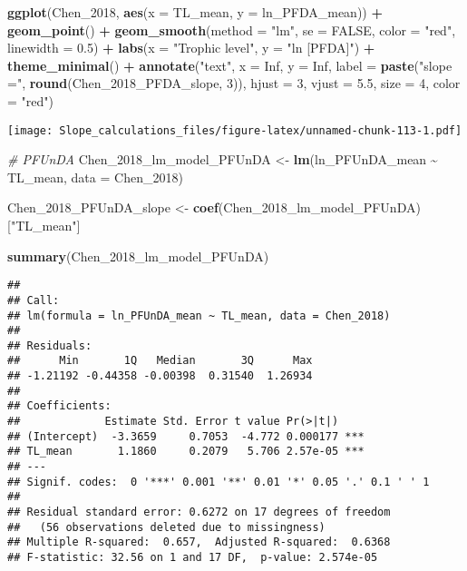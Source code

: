 \documentclass[
]{article}
\newenvironment{Shaded}{\begin{snugshade}}{\end{snugshade}}
\newcommand{\AttributeTok}[1]{\textcolor[rgb]{0.13,0.29,0.53}{#1}}
\newcommand{\CommentTok}[1]{\textcolor[rgb]{0.56,0.35,0.01}{\textit{#1}}}
\newcommand{\ConstantTok}[1]{\textcolor[rgb]{0.56,0.35,0.01}{#1}}
\newcommand{\DecValTok}[1]{\textcolor[rgb]{0.00,0.00,0.81}{#1}}
\newcommand{\FloatTok}[1]{\textcolor[rgb]{0.00,0.00,0.81}{#1}}
\newcommand{\FunctionTok}[1]{\textcolor[rgb]{0.13,0.29,0.53}{\textbf{#1}}}
\newcommand{\NormalTok}[1]{#1}
\newcommand{\OtherTok}[1]{\textcolor[rgb]{0.56,0.35,0.01}{#1}}
\newcommand{\SpecialCharTok}[1]{\textcolor[rgb]{0.81,0.36,0.00}{\textbf{#1}}}
\newcommand{\StringTok}[1]{\textcolor[rgb]{0.31,0.60,0.02}{#1}}
\begin{document}
\begin{Shaded}
\begin{Highlighting}[]
\FunctionTok{ggplot}\NormalTok{(Chen\_2018, }\FunctionTok{aes}\NormalTok{(}\AttributeTok{x =}\NormalTok{ TL\_mean, }\AttributeTok{y =}\NormalTok{ ln\_PFDA\_mean)) }\SpecialCharTok{+}
  \FunctionTok{geom\_point}\NormalTok{() }\SpecialCharTok{+}
  \FunctionTok{geom\_smooth}\NormalTok{(}\AttributeTok{method =} \StringTok{"lm"}\NormalTok{, }\AttributeTok{se =} \ConstantTok{FALSE}\NormalTok{, }\AttributeTok{color =} \StringTok{"red"}\NormalTok{, }\AttributeTok{linewidth =} \FloatTok{0.5}\NormalTok{) }\SpecialCharTok{+}
  \FunctionTok{labs}\NormalTok{(}\AttributeTok{x =} \StringTok{"Trophic level"}\NormalTok{,}
       \AttributeTok{y =} \StringTok{"ln [PFDA]"}\NormalTok{) }\SpecialCharTok{+}
  \FunctionTok{theme\_minimal}\NormalTok{() }\SpecialCharTok{+}
  \FunctionTok{annotate}\NormalTok{(}\StringTok{"text"}\NormalTok{, }\AttributeTok{x =} \ConstantTok{Inf}\NormalTok{, }\AttributeTok{y =} \ConstantTok{Inf}\NormalTok{, }\AttributeTok{label =} \FunctionTok{paste}\NormalTok{(}\StringTok{"slope ="}\NormalTok{, }\FunctionTok{round}\NormalTok{(Chen\_2018\_PFDA\_slope, }\DecValTok{3}\NormalTok{)), }
           \AttributeTok{hjust =} \DecValTok{3}\NormalTok{, }\AttributeTok{vjust =} \FloatTok{5.5}\NormalTok{, }\AttributeTok{size =} \DecValTok{4}\NormalTok{, }\AttributeTok{color =} \StringTok{"red"}\NormalTok{)}
\end{Highlighting}
\end{Shaded}

\texttt{[image: Slope\_calculations\_files/figure-latex/unnamed-chunk-113-1.pdf]}

\begin{Shaded}
\begin{Highlighting}[]
\CommentTok{\# PFUnDA}
\NormalTok{Chen\_2018\_lm\_model\_PFUnDA }\OtherTok{\textless{}{-}} \FunctionTok{lm}\NormalTok{(ln\_PFUnDA\_mean }\SpecialCharTok{\textasciitilde{}}\NormalTok{ TL\_mean,}
                             \AttributeTok{data =}\NormalTok{ Chen\_2018)}

\NormalTok{Chen\_2018\_PFUnDA\_slope }\OtherTok{\textless{}{-}} \FunctionTok{coef}\NormalTok{(Chen\_2018\_lm\_model\_PFUnDA)[}\StringTok{"TL\_mean"}\NormalTok{]}

\FunctionTok{summary}\NormalTok{(Chen\_2018\_lm\_model\_PFUnDA)}
\end{Highlighting}
\end{Shaded}

\begin{verbatim}
## 
## Call:
## lm(formula = ln_PFUnDA_mean ~ TL_mean, data = Chen_2018)
## 
## Residuals:
##      Min       1Q   Median       3Q      Max 
## -1.21192 -0.44358 -0.00398  0.31540  1.26934 
## 
## Coefficients:
##             Estimate Std. Error t value Pr(>|t|)    
## (Intercept)  -3.3659     0.7053  -4.772 0.000177 ***
## TL_mean       1.1860     0.2079   5.706 2.57e-05 ***
## ---
## Signif. codes:  0 '***' 0.001 '**' 0.01 '*' 0.05 '.' 0.1 ' ' 1
## 
## Residual standard error: 0.6272 on 17 degrees of freedom
##   (56 observations deleted due to missingness)
## Multiple R-squared:  0.657,  Adjusted R-squared:  0.6368 
## F-statistic: 32.56 on 1 and 17 DF,  p-value: 2.574e-05
\end{verbatim}
\end{document}
